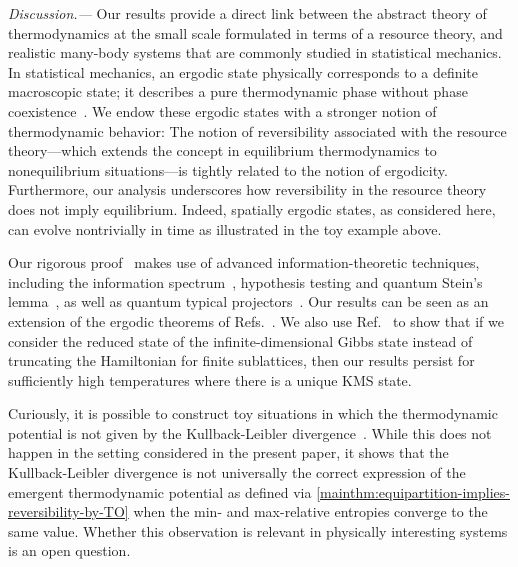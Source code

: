 \documentclass[prl,reprint,longbibliography,superscriptaddress]{revtex4-1}
\newcounter{thm}
\renewcommand\paragraph[1]{%
  \par\emph{#1.---}\kern2pt\relax\ignorespaces}
\begin{document}
\paragraph{Discussion}%
%
Our results provide a direct link between the abstract theory of thermodynamics
at the small scale formulated in terms of a resource theory, and realistic
many-body systems that are commonly studied in statistical mechanics. 
%
In statistical mechanics, an ergodic state physically corresponds to a definite
macroscopic state; it describes a pure thermodynamic phase without phase
coexistence~\cite{Ruelle1999}.
%
We endow these ergodic states with a stronger notion of thermodynamic behavior:
%
The notion of reversibility associated with the resource theory---which extends
the concept in equilibrium thermodynamics to nonequilibrium
situations---is tightly related to the notion of ergodicity.
%
Furthermore, our analysis underscores how reversibility in the resource theory
does not imply equilibrium.  Indeed, spatially ergodic states, as considered here,
can evolve nontrivially in time as illustrated in the toy example
above.

Our rigorous proof~\cite{Sagawa-CMP-inprep} makes use of advanced
information-theoretic techniques, including the information
spectrum~\cite{BookHan_InfSpecMethods,%
  Han2000IEEETIT_hypothesis,%
  Nagaoka2007IEEETIT_hypothesis,%
  Datta2009IEEE_InfSpec,%
  Bowen2006ISIT_beyondiid,%
  Bowen2006arXiv_arbitrary,%
  Schoenmakers2007ISIT_Renyi}, hypothesis testing and quantum Stein's
lemma~\cite{Hiai1991CMP_proper,%
  Ogawa2000IEEETIT_Stein,%
  Tomamichel2013_hierarchy,%
  Dupuis2013_DH}, as well as quantum typical projectors~\cite{%
  BookWilde2013QIT,Bjelakovic2003arXiv_revisted,%
  Bjelakovic2004IM_lattice,Bjelakovic2004CMP_ergodic}.
%
Our results can be seen as an extension of the ergodic theorems of
Refs.~\cite{Bjelakovic2004CMP_ergodic,Bjelakovic2004IM_lattice}.
%
We also use Ref.~\cite{Lenci2005JSP_onephase} to show that if we consider the
reduced state of the infinite-dimensional Gibbs state instead of truncating the
Hamiltonian for finite sublattices, then our results persist for sufficiently
high temperatures where there is a unique KMS state.


Curiously, it is possible to construct toy situations in which the thermodynamic
potential is not given by the Kullback-Leibler
divergence~\cite{Sagawa-CMP-inprep}.
While this does not happen in the setting considered in the present paper, it
shows that the Kullback-Leibler divergence is not universally the correct
expression of the emergent thermodynamic potential as defined via
\cref{mainthm:equipartition-implies-reversibility-by-TO} when the min- and
max-relative entropies converge to the same value.  Whether this observation is
relevant in physically interesting systems is an open question.
\end{document}
